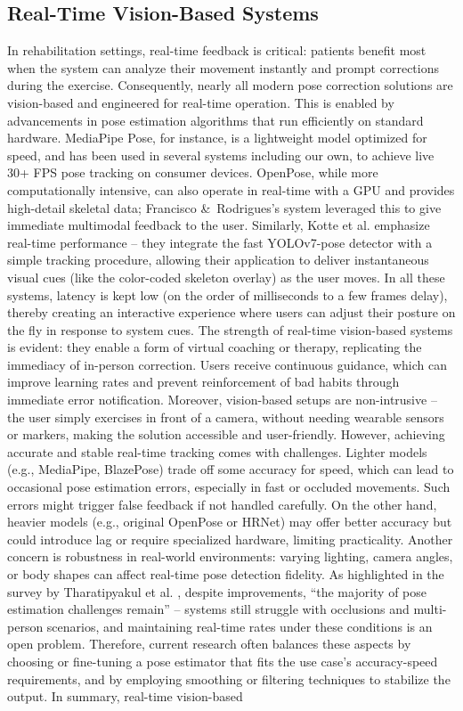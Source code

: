 \documentclass{article}
\begin{document}
\subsection{Real-Time Vision-Based Systems} In rehabilitation settings, real-time feedback is critical: patients benefit most when the system can analyze their movement instantly and prompt corrections during the exercise. Consequently, nearly all modern pose correction solutions are vision-based and engineered for real-time operation. This is enabled by advancements in pose estimation algorithms that run efficiently on standard hardware. MediaPipe Pose, for instance, is a lightweight model optimized for speed, and has been used in several systems \cite{Tharatipyakul2024Review} including our own, to achieve live 30+ FPS pose tracking on consumer devices. OpenPose, while more computationally intensive, can also operate in real-time with a GPU and provides high-detail skeletal data; Francisco \&\ Rodrigues’s system \cite{Francisco2022} leveraged this to give immediate multimodal feedback to the user. Similarly, Kotte et al. \cite{Kotte2023} emphasize real-time performance – they integrate the fast YOLOv7-pose detector with a simple tracking procedure, allowing their application to deliver instantaneous visual cues (like the color-coded skeleton overlay) as the user moves. In all these systems, latency is kept low (on the order of milliseconds to a few frames delay), thereby creating an interactive experience where users can adjust their posture on the fly in response to system cues. The strength of real-time vision-based systems is evident: they enable a form of virtual coaching or therapy, replicating the immediacy of in-person correction. Users receive continuous guidance, which can improve learning rates and prevent reinforcement of bad habits through immediate error notification. Moreover, vision-based setups are non-intrusive – the user simply exercises in front of a camera, without needing wearable sensors or markers, making the solution accessible and user-friendly. However, achieving accurate and stable real-time tracking comes with challenges. Lighter models (e.g., MediaPipe, BlazePose) trade off some accuracy for speed, which can lead to occasional pose estimation errors, especially in fast or occluded movements. Such errors might trigger false feedback if not handled carefully. On the other hand, heavier models (e.g., original OpenPose or HRNet) may offer better accuracy but could introduce lag or require specialized hardware, limiting practicality. Another concern is robustness in real-world environments: varying lighting, camera angles, or body shapes can affect real-time pose detection fidelity. As highlighted in the survey by Tharatipyakul et al. \cite{Tharatipyakul2024Review}, despite improvements, “the majority of pose estimation challenges remain” – systems still struggle with occlusions and multi-person scenarios, and maintaining real-time rates under these conditions is an open problem. Therefore, current research often balances these aspects by choosing or fine-tuning a pose estimator that fits the use case’s accuracy-speed requirements, and by employing smoothing or filtering techniques to stabilize the output. In summary, real-time vision-based 
\end{document}
